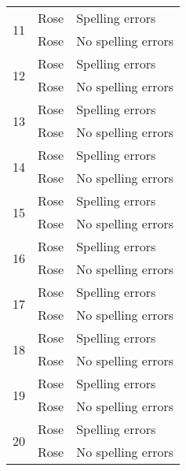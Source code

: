 \begin{table}[!ht]
\begin{center}
\begin{tabular}[center]{| l | l | l |}
         \hline \hline
         \multirow{2}{*}{11} & Rose & Spelling errors \\
                             & Rose & No spelling errors \\
         \hline
         \multirow{2}{*}{12} & Rose & Spelling errors \\
                             & Rose & No spelling errors \\
         \hline
         \multirow{2}{*}{13} & Rose & Spelling errors \\
                             & Rose & No spelling errors \\
         \hline
         \multirow{2}{*}{14} & Rose & Spelling errors \\
                             & Rose & No spelling errors \\
         \hline
         \multirow{2}{*}{15} & Rose & Spelling errors \\
                             & Rose & No spelling errors \\
         \hline
         \multirow{2}{*}{16} & Rose & Spelling errors \\
                             & Rose & No spelling errors \\
         \hline
         \multirow{2}{*}{17} & Rose & Spelling errors \\
                             & Rose & No spelling errors \\
         \hline
         \multirow{2}{*}{18} & Rose & Spelling errors \\
                             & Rose & No spelling errors \\
         \hline
         \multirow{2}{*}{19} & Rose & Spelling errors \\
                             & Rose & No spelling errors \\
         \hline
         \multirow{2}{*}{20} & Rose & Spelling errors \\
                             & Rose & No spelling errors \\
         \hline
      \end{tabular}
   \end{center}
\end{table}
